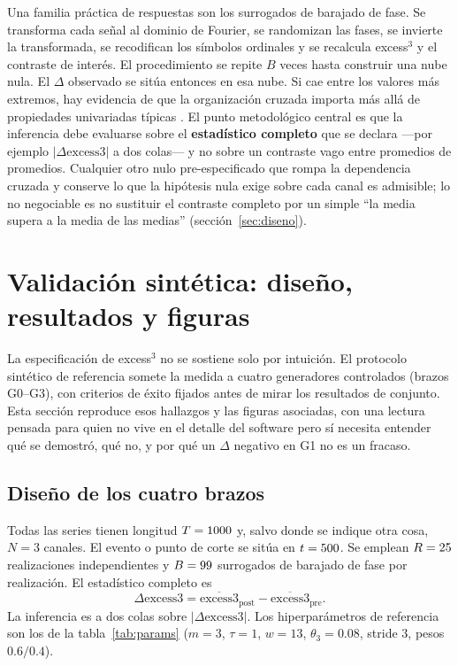 \documentclass[11pt,a4paper]{article}
\begin{document}
Una familia pr\'actica de respuestas son los surrogados de barajado de fase.
Se transforma cada se\~nal al dominio de Fourier, se randomizan las fases, se
invierte la transformada, se recodifican los s\'imbolos ordinales y se
recalcula excess$^3$ y el contraste de inter\'es. El procedimiento se repite
$B$ veces hasta construir una nube nula. El $\Delta$ observado se sit\'ua
entonces en esa nube. Si cae entre los valores m\'as extremos, hay evidencia
de que la organizaci\'on cruzada importa m\'as all\'a de propiedades
univariadas t\'ipicas \citep{Padilla2026excess3}. El punto metodol\'ogico
central es que la inferencia debe evaluarse sobre el \textbf{estad\'istico
completo} que se declara ---por ejemplo $|\Delta\mathrm{excess3}|$ a dos
colas--- y no sobre un contraste vago entre promedios de promedios. Cualquier
otro nulo pre-especificado que rompa la dependencia cruzada y conserve lo
que la hip\'otesis nula exige sobre cada canal es admisible; lo no negociable
es no sustituir el contraste completo por un simple ``la media supera a la
media de las medias'' (secci\'on~\ref{sec:diseno}).

\section{Validaci\'on sint\'etica: dise\~no, resultados y figuras}
\label{sec:validation}

La especificaci\'on de excess$^3$ no se sostiene solo por intuici\'on. El
protocolo sint\'etico de referencia \citep{Padilla2026excess3} somete la
medida a cuatro generadores controlados (brazos G0--G3), con criterios de
\'exito fijados antes de mirar los resultados de conjunto. Esta secci\'on
reproduce esos hallazgos y las figuras asociadas, con una lectura pensada
para quien no vive en el detalle del software pero s\'i necesita entender
qu\'e se demostr\'o, qu\'e no, y por qu\'e un $\Delta$ negativo en G1 no es un
fracaso.

\subsection{Dise\~no de los cuatro brazos}

Todas las series tienen longitud $T=1000$ y, salvo donde se indique otra
cosa, $N=3$ canales. El evento o punto de corte se sit\'ua en
$t=500$. Se emplean $R=25$ realizaciones independientes y
$B=99$ surrogados de barajado de fase por realizaci\'on. El estad\'istico
completo es
\begin{equation*}
\Delta\mathrm{excess3}
=
\overline{\mathrm{excess3}}_{\mathrm{post}}
-
\overline{\mathrm{excess3}}_{\mathrm{pre}}.
\end{equation*}
La inferencia es a dos colas sobre $|\Delta\mathrm{excess3}|$. Los
hiperpar\'ametros de referencia son los de la tabla~\ref{tab:params}
($m=3$, $\tau=1$, $w=13$, $\theta_3=0.08$, stride $3$, pesos $0.6/0.4$).
\end{document}
